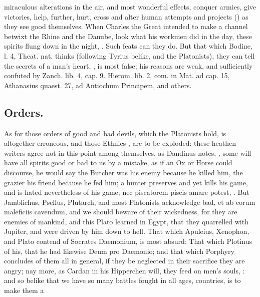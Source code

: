 {{miraculous alterations in the air, and most wonderful effects, conquer
armies, give victories, help, further, hurt, cross and alter human
attempts and projects () as they see good themselves.
When Charles the Great intended to make a channel betwixt the
Rhine and the Danube, look what his workmen did in the day, these
spirits flung down in the night, .
Such feats can they do. But that which Bodine, l. 4, Theat. nat. thinks
(following Tyrius belike, and the Platonists), they can tell the
secrets of a man's heart, , is most false; his
reasons are weak, and sufficiently confuted by Zanch. lib. 4, cap. 9.
Hierom. lib. 2, com. in Mat. ad cap. 15, Athanasius quaest. 27, ad
Antiochum Principem, and others.

\subsection{Orders.}
As for those orders of good and bad devils, which the
Platonists hold, is altogether erroneous, and those Ethnics , are to be exploded: these heathen writers agree not in this
point among themselves, as Dandinus notes, , some will have all spirits good or bad to us by a mistake,
as if an Ox or Horse could discourse, he would say the Butcher was his
enemy because he killed him, the grazier his friend because he fed him;
a hunter preserves and yet kills his game, and is hated nevertheless of
his game; nec piscatorem piscis amare potest, \etc{}. But Jamblichus,
Psellus, Plutarch, and most Platonists acknowledge bad, et ab eorum
maleficiis cavendum, and we should beware of their wickedness, for they
are enemies of mankind, and this Plato learned in Egypt, that they
quarrelled with Jupiter, and were driven by him down to hell.
That which Apuleius, Xenophon, and Plato contend of
Socrates Daemonium, is most absurd: That which Plotinus of his, that he
had likewise Deum pro Daemonio; and that which Porphyry concludes of
them all in general, if they be neglected in their sacrifice they are
angry; nay more, as Cardan in his Hipperchen will, they feed on men's
souls, : and so belike that we
have so many battles fought in all ages, countries, is to make them a
}}
